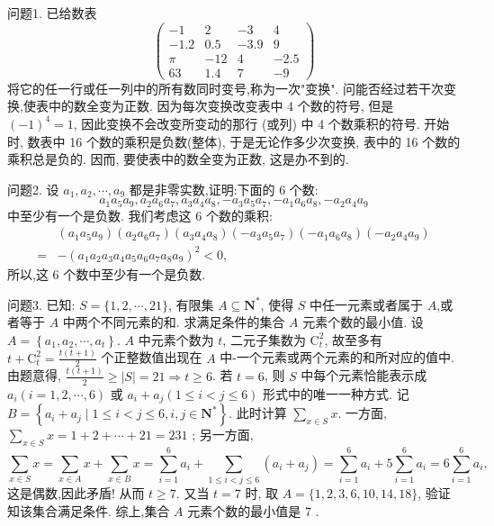 
问题1. 已给数表
$$
\left(\begin{array}{cccc}
-1 & 2 & -3 & 4 \\
-1.2 & 0.5 & -3.9 & 9 \\
\pi & -12 & 4 & -2.5 \\
63 & 1.4 & 7 & -9
\end{array}\right)
$$
将它的任一行或任一列中的所有数同时变号,称为一次"变换". 问能否经过若干次变换,使表中的数全变为正数.
因为每次变换改变表中 4 个数的符号, 但是 $(-1)^4=1$, 因此变换不会改变所变动的那行 (或列) 中 4 个数乘积的符号.
开始时, 数表中 16 个数的乘积是负数(整体), 于是无论作多少次变换, 表中的 16 个数的乘积总是负的.
因而, 要使表中的数全变为正数, 这是办不到的.



问题2. 设 $a_1, a_2, \cdots, a_9$ 都是非零实数,证明:下面的 6 个数:
$$
a_1 a_5 a_9, a_2 a_6 a_7, a_3 a_4 a_8,-a_3 a_5 a_7,-a_1 a_6 a_8,-a_2 a_4 a_9
$$
中至少有一个是负数.
我们考虑这 6 个数的乘积:
$$
\begin{aligned}
& \left(a_1 a_5 a_9\right)\left(a_2 a_6 a_7\right)\left(a_3 a_4 a_8\right)\left(-a_3 a_5 a_7\right)\left(-a_1 a_6 a_8\right)\left(-a_2 a_4 a_9\right) \\
= & -\left(a_1 a_2 a_3 a_4 a_5 a_6 a_7 a_8 a_9\right)^2<0,
\end{aligned}
$$
所以,这 6 个数中至少有一个是负数.



问题3. 已知: $S=\{1,2, \cdots, 21\}$, 有限集 $A \subseteq \mathbf{N}^*$, 使得 $S$ 中任一元素或者属于 $A$,或者等于 $A$ 中两个不同元素的和.
求满足条件的集合 $A$ 元素个数的最小值.
设 $A=\left\{a_1, a_2, \cdots, a_t\right\}$.
$A$ 中元素个数为 $t$, 二元子集数为 $\mathrm{C}_t^2$, 故至多有 $t+\mathrm{C}_t^2=\frac{t(t+1)}{2}$ 个正整数值出现在 $A$ 中-一个元素或两个元素的和所对应的值中.
由题意得, $\frac{t(t+1)}{2} \geqslant|S|=21 \Rightarrow t \geqslant 6$.
若 $t=6$, 则 $S$ 中每个元素恰能表示成 $a_i(i=1,2, \cdots, 6)$ 或 $a_i+a_j(1 \leqslant i<j \leqslant 6)$ 形式中的唯一一种方式.
记 $B=\left\{a_i+a_j \mid 1 \leqslant i<j \leqslant 6, i, j \in \mathbf{N}^*\right\}$. 此时计算 $\sum_{x \in S} x$.
一方面, $\sum_{x \in S} x=1+2+\cdots+21=231$ ;
另一方面,
$$
\sum_{x \in S} x=\sum_{x \in A} x+\sum_{x \in B} x=\sum_{i=1}^6 a_i+\sum_{1 \leqslant i<j \leqslant 6}\left(a_i+a_j\right)=\sum_{i=1}^6 a_i+5 \sum_{i=1}^6 a_i=6 \sum_{i=1}^6 a_i,
$$
这是偶数,因此矛盾! 从而 $t \geqslant 7$.
又当 $t=7$ 时, 取 $A=\{1,2,3,6,10,14,18\}$, 验证知该集合满足条件.
综上,集合 $A$ 元素个数的最小值是 7 .



